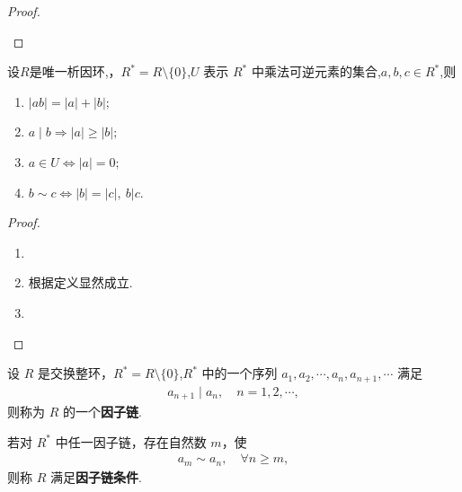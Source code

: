 \documentclass[../../main.tex]{subfiles}%
\begin{document}
\begin{proof}
\begin{enumerate}[(1)]
\end{enumerate}
\end{proof}

\begin{theorem}\label{theorem:UFD中元素的长度的基本性质}
设$R$是唯一析因环,，\( R^* = R \setminus \{0\} \),\( U \) 表示 \( R^* \) 中乘法可逆元素的集合,$a,b,c\in R^*$,则
\begin{enumerate}[(1)]
\item\label{theorem:UFD中元素的长度的基本性质-1} $|ab|=|a|+|b|;$

\item\label{theorem:UFD中元素的长度的基本性质-4} $a\mid b\Longrightarrow |a|\geqslant |b|;$

\item\label{theorem:UFD中元素的长度的基本性质-2} $a \in U \iff |a| = 0;$

\item\label{theorem:UFD中元素的长度的基本性质-3} $b \sim c \iff |b| = |c|,\ b|c.$
\end{enumerate}
\end{theorem}
\begin{proof}
\begin{enumerate}[(1)]
\item 

\item 根据定义显然成立.

\item 
\end{enumerate}
\end{proof}

\begin{definition}
设 \( R \) 是交换整环，\( R^* = R \setminus \{0\} \),\( R^* \) 中的一个序列 \( a_1, a_2, \cdots, a_n, a_{n+1}, \cdots \) 满足
\begin{align*}
a_{n+1} \mid a_n, \quad n = 1, 2, \cdots,
\end{align*}
则称为 \( R \) 的一个\textbf{因子链}.

若对 \( R^* \) 中任一因子链，存在自然数 \( m \)，使
\begin{align*}
a_m \sim a_n, \quad \forall n \geqslant m,
\end{align*}
则称 \( R \) 满足\textbf{因子链条件}.
\end{definition}
\end{document}
